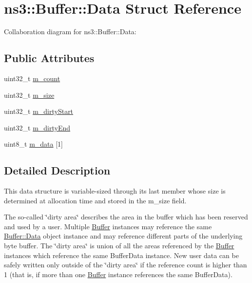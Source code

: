 \hypertarget{structns3_1_1Buffer_1_1Data}{}\section{ns3\+:\+:Buffer\+:\+:Data Struct Reference}
\label{structns3_1_1Buffer_1_1Data}


Collaboration diagram for ns3\+:\+:Buffer\+:\+:Data\+:
\subsection*{Public Attributes}
\begin{DoxyCompactItemize}
\item 
uint32\+\_\+t \hyperlink{structns3_1_1Buffer_1_1Data_a9d2c411830a0a352108f900e19f0728e}{m\+\_\+count}
\item 
uint32\+\_\+t \hyperlink{structns3_1_1Buffer_1_1Data_abebf3f94b05bb904b45a82a2f3193180}{m\+\_\+size}
\item 
uint32\+\_\+t \hyperlink{structns3_1_1Buffer_1_1Data_ac946973842bf5c652f6f1209668de0fe}{m\+\_\+dirty\+Start}
\item 
uint32\+\_\+t \hyperlink{structns3_1_1Buffer_1_1Data_a76ba53202d79de545e0000aab663cb54}{m\+\_\+dirty\+End}
\item 
uint8\+\_\+t \hyperlink{structns3_1_1Buffer_1_1Data_a29e7d0a3b4e7e8272d06eb8c8e51ed04}{m\+\_\+data} \mbox{[}1\mbox{]}
\end{DoxyCompactItemize}


\subsection{Detailed Description}
This data structure is variable-\/sized through its last member whose size is determined at allocation time and stored in the m\+\_\+size field.

The so-\/called \char`\"{}dirty area\char`\"{} describes the area in the buffer which has been reserved and used by a user. Multiple \hyperlink{classns3_1_1Buffer}{Buffer} instances may reference the same \hyperlink{structns3_1_1Buffer_1_1Data}{Buffer\+::\+Data} object instance and may reference different parts of the underlying byte buffer. The \char`\"{}dirty area\char`\"{} is union of all the areas referenced by the \hyperlink{classns3_1_1Buffer}{Buffer} instances which reference the same Buffer\+Data instance. New user data can be safely written only outside of the \char`\"{}dirty
area\char`\"{} if the reference count is higher than 1 (that is, if more than one \hyperlink{classns3_1_1Buffer}{Buffer} instance references the same Buffer\+Data). 

